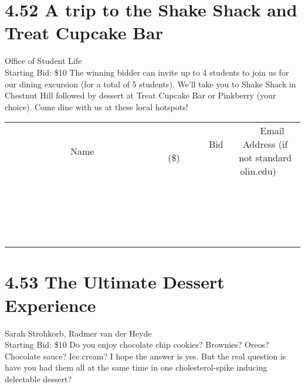 \documentclass[11pt]{article}
\begin{document}
\section*{4.52 A trip to the Shake Shack and Treat Cupcake Bar}
Office of Student Life
\\
Starting Bid: \$10
\newline
The winning bidder can invite up to 4 students to join us for our dining excursion (for a total of 5 students). We'll take you to Shake Shack in Chestnut Hill followed by dessert at Treat Cupcake Bar or Pinkberry (your choice).  Come dine with us at these local hotspots!
\\[3ex]
\begin{tabular}{c c c}
~~~~~~~~~~~~~Name~~~~~~~~~~~~~ & ~~~~~~~~~Bid (\$)~~~~~~~~~  & ~~~Email Address (if not standard olin.edu)~~~\\
 & & \\
\hline
 & & \\
\hline
 & & \\
\hline
 & & \\
\hline
 & & \\
\hline
 & & \\
\hline
 & & \\
\hline
 & & \\
\hline
 & & \\
\hline
 & & \\
\hline
 & & \\
\hline
 & & \\
\hline
 & & \\
\hline
 & & \\
\hline
 & & \\
\hline
 & & \\
\hline
 & & \\
\hline
 & & \\
\hline
 & & \\
\hline
\end{tabular}
\newpage
\section*{4.53 The Ultimate Dessert Experience }
Sarah Strohkorb, Radmer van der Heyde
\\
Starting Bid: \$10
\newline
Do you enjoy chocolate chip cookies? Brownies? Oreos? Chocolate sauce? Ice cream? I hope the answer is yes. But the real question is have you had them all at the same time in one cholesterol-spike inducing delectable dessert? 
\end{document}
